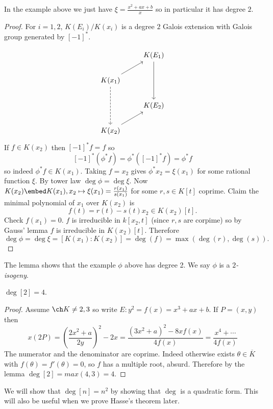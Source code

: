 \documentclass[a4paper]{article}
\theoremstyle{definition}
\theoremstyle{theorem}
\begin{document}
\begin{eg}
  In the example above we just have \(\xi = \frac{x^2 + ax + b}{x}\) so in particular it has degree \(2\).
\end{eg}

\begin{proof}
  For \(i = 1, 2\), \(K(E_i)/K(x_i)\) is a degree \(2\) Galois extension with Galois group generated by \([-1]^*\).

  \[
    \begin{tikzcd}
      & K(E_1) \ar[dd] \\
      K(x_1) \ar[ur] \ar[dd, dashed] \\
      & K(E_2) \\
      K(x_2) \ar[ur]
    \end{tikzcd}
  \]
  If \(f \in K(x_2)\) then \([-1]^* f = f\) so
  \[
    [-1]^*(\phi^* f) = \phi^*([-1]^* f) = \phi^* f
  \]
  so indeed \(\phi^*f \in K(x_1)\). Taking \(f = x_2\) gives \(\phi^*x_2 = \xi(x_1)\) for some rational function \(\xi\). By tower law \(\deg \phi = \deg \xi\). Now \(K(x_2) \embed K(x_1), x_2 \mapsto \xi(x_1) = \frac{r(x_1)}{s(x_1)}\) for some \(r, s \in K[t]\) coprime. Claim the minimal polynomial of \(x_1\) over \(K(x_2)\) is
  \[
    f(t) = r(t) - s(t)x_2 \in K(x_2)[t].
  \]
  Check \(f(x_1) = 0\). \(f\) is irreducible in \(k[x_2, t]\) (since \(r, s\) are corpime) so by Gauss' lemma \(f\) is irreducible in \(K(x_2)[t]\). Therefore
  \[
    \deg \phi = \deg \xi = [K(x_1): K(x_2)] = \deg(f) = \max(\deg(r), \deg(s)).
  \]
\end{proof}

The lemma shows that the example \(\phi\) above has degree 2. We say \(\phi\) is a \emph{\(2\)-isogeny}.

\begin{lemma}
  \(\deg [2] = 4\).
\end{lemma}

\begin{proof}
  Assume \(\ch K \neq 2, 3\) so write \(E: y^2 = f(x) = x^3 + ax + b\). If \(P = (x, y)\) then
  \[
    x(2P)
    = \left( \frac{2x^2 + a}{2y} \right)^2 - 2x
    = \frac{(3x^2 + a)^2 - 8x f(x)}{4 f(x)} 
    = \frac{x^4 + \cdots}{4 f(x)}
  \]
  The numerator and the denominator are coprime. Indeed otherwise exists \(\theta \in \overline K\) with \(f(\theta) = f'(\theta) = 0\), so \(f\) has a multiple root, absurd. Therefore by the lemma \(\deg [2] = max(4, 3) = 4\).
\end{proof}

We will show that \(\deg [n] = n^2\) by showing that \(\deg\) is a quadratic form. This will also be useful when we prove Hasse's theorem later.
\end{document}
